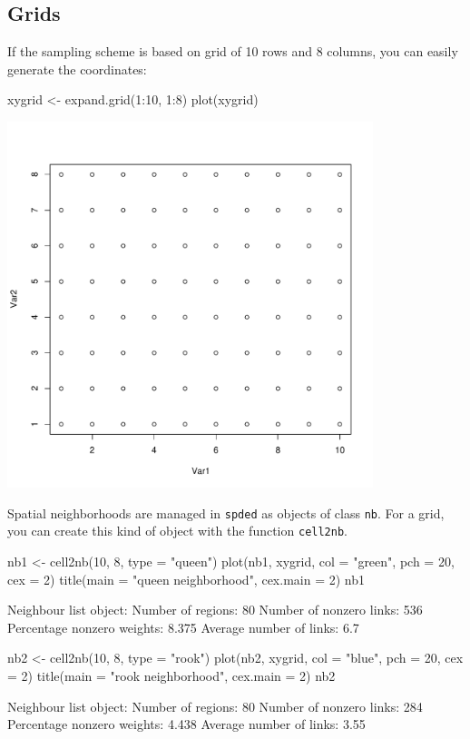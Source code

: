 \documentclass[a4paper]{article}
\begin{document}
\subsection{Grids}
If the sampling scheme is based on grid of 10 rows and 8 columns, you can easily generate the coordinates:

\begin{Schunk}
\begin{Sinput}
 xygrid <- expand.grid(1:10, 1:8)
 plot(xygrid)
\end{Sinput}
\end{Schunk}
\begin{center}
\includegraphics[width=0.8\textwidth,keepaspectratio]{figs/tutorial-ni2}
\end{center}

Spatial neighborhoods are managed in \texttt{spded} as objects of class \texttt{nb}. For a grid, you can create this kind of object with the function \texttt{cell2nb}.
\begin{Schunk}
\begin{Sinput}
 nb1 <- cell2nb(10, 8, type = "queen")
 plot(nb1, xygrid, col = "green", pch = 20, cex = 2)
 title(main = "queen neighborhood", cex.main = 2)
 nb1
\end{Sinput}
\begin{Soutput}
Neighbour list object:
Number of regions: 80 
Number of nonzero links: 536 
Percentage nonzero weights: 8.375 
Average number of links: 6.7 
\end{Soutput}
\end{Schunk}
\begin{Schunk}
\begin{Sinput}
 nb2 <- cell2nb(10, 8, type = "rook")
 plot(nb2, xygrid, col = "blue", pch = 20, cex = 2)
 title(main = "rook neighborhood", cex.main = 2)
 nb2
\end{Sinput}
\begin{Soutput}
Neighbour list object:
Number of regions: 80 
Number of nonzero links: 284 
Percentage nonzero weights: 4.438 
Average number of links: 3.55 
\end{Soutput}
\end{Schunk}
\end{document}
